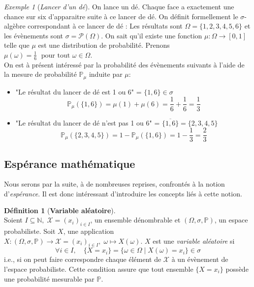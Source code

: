 \documentclass[12pt,a4paper]{report}
\theoremstyle{definition}%
\newtheorem{definition}{Définition}[chapter]
\theoremstyle{remark}
\newtheorem{example}{Exemple}[chapter]
\newcommand{\ie}{i.e., }
\newcommand{\pr}{\mathbb{P}}
\let\labelitemi\labelitemii
\begin{document}
\begin{example}[\textit{Lancer d'un dé}]\label{die}
	On lance un dé. Chaque face a exactement une chance sur six d'apparaitre suite à ce lancer de dé. On définit formellement le $\sigma$-algèbre correspondant à ce lancer de dé :
	Les résultats sont $\Omega = \{1, 2, 3, 4, 5, 6\}$ et les évènements sont $\sigma = \mathcal{P}(\Omega)$.
	On sait qu'il existe une fonction $\mu: \Omega \rightarrow [0,1]$ telle que $\mu$ est une distribution de probabilité. Prenons $\mu(\omega) = \frac{1}{6} \; \text{ pour tout } \omega \in \Omega$.\\
	On est à présent intéressé par la probabilité des évènements suivants à l'aide de la mesure de probabilité $\pr_{\mu}$ induite par $\mu$:
	\begin{itemize}
		\renewcommand{\labelitemi}{\tiny$\bullet$}
		\item "Le résultat du lancer de dé est 1 ou 6" = $\{1, 6\} \in \sigma$
		\[\pr_{\mu}(\{1,6\}) = \mu(1) + \mu(6) = \frac{1}{6} + \frac{1}{6} = \frac{1}{3}\]
		\item "Le résultat du lancer de dé n'est pas 1 ou 6" = $\overline{\{1, 6\}} = \{2, 3, 4, 5\}$
		\[\pr_{\mu}(\{2, 3, 4, 5\}) = 1 - \pr_{\mu}(\{1, 6\}) = 1 - \frac{1}{3} = \frac{2}{3}\]
	\end{itemize}
\end{example}

\subsection*{Espérance mathématique}
Nous serons par la suite, à de nombreuses reprises, confrontés à la notion d'\textit{espérance}. Il est donc intéressant d'introduire les concepts liés à cette notion.

\begin{definition}[\textbf{Variable aléatoire}]~\cite{Course2} \\
	Soient $I \subseteq \mathbb{N}, \; \mathcal X = (x_i)_{i \in I}$, un ensemble dénombrable et $(\Omega, \sigma, \pr)$, un espace probabiliste. Soit $X$, une application $X:
	(\Omega, \sigma, \pr) \rightarrow \mathcal{X} = (x_i)_{i \in I}, \;
	\omega \mapsto X(\omega)
	$.
	$X$ est une \textit{variable aléatoire} si
	\[\forall i \in I, \quad \{X = x_i\} = \{\omega \in \Omega \; | \; X(\omega) = x_i \} \in \sigma\]
	\ie si on peut faire correspondre chaque élément de $\mathcal{X}$  à un évènement de l'espace probabiliste. Cette condition assure que tout ensemble $\{X = x_i\}$ possède une probabilité mesurable par $\pr$.
\end{definition}
\end{document}

